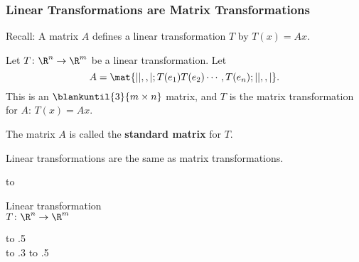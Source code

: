 
\begin{frame}
\frametitle{Linear Transformations are Matrix Transformations}

\alert{Recall:} A matrix $A$ defines a linear transformation $T$ by $T(x) = Ax$.

\pause
\begin{thm}
  Let $T\colon\R^n\to\R^m$ be a linear transformation.  Let
  \[ A = \mat{| | ,, |; T(e_1) T(e_2) \cdots, T(e_n); | | ,, | }. \]
  This is an $\blankuntil{3}{m\times n}$ matrix, 
  \pause 
  and $T$ is the matrix transformation for $A$: $T(x) = Ax$.

  \pause\smallskip
  The matrix $A$ is called the \textbf{standard matrix} for $T$.
\end{thm}

\pause
\begin{bluebox}{.85\linewidth}\centering
  Linear transformations are the same as matrix transformations.
\end{bluebox}

\pause
\hbox to 
\pause\leavevmode
\parbox{.3\linewidth}{\centering
  Linear transformation\\$T\colon\R^n\to\R^m$}%
\;\longsquiggly\;
\hbox to .5\\[1mm]
\pause\leavevmode
\hbox to .3\linewidth{\hfil
  $\begin{aligned}&T(x) = Ax\\&T\colon\R^n\to\R^m\end{aligned}$\hfil}%
\;\rlongsquiggly\;
\hbox to .5\linewidth{$m\times n$ matrix $A$\hfil}

\end{frame}



